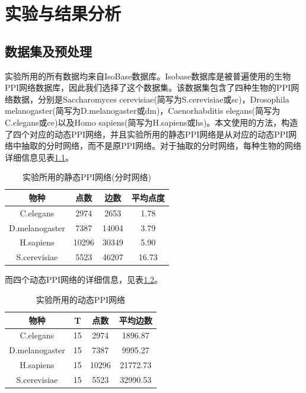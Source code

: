 \chapter{实验与结果分析}

\section{数据集及预处理}
实验所用的所有数据均来自IsoBase数据库\cite{park2011isobase}。Isobase数据库是被普遍使用的生物PPI网络数据库，因此我们选择了这个数据集。该数据集包含了四种生物的PPI网络数据，分别是Saccharomyces cerevisiae(简写为S.cerevisiae或sc)，Drosophila melanogaster(简写为D.melanogaster或dm)，Caenorhabditis elegans(简写为C.elegans或ce)以及Homo sapiens(简写为H.sapiens或hs)。本文使用\cite{zhang2016method}的方法，构造了四个对应的动态PPI网络，并且实验所用的静态PPI网络是从对应的动态PPI网络中抽取的分时网络，而不是原PPI网络。对于抽取的分时网络，每种生物的网络详细信息见表\ref{table:1.1}。

\begin{table}[htbp]
    \centering
    \caption{实验所用的静态PPI网络(分时网络)}
    \label{table:1.1}
    \begin{tabular}{cccc}
         \hline 物种&点数&边数&平均点度\\
         \hline C.elegans&2974&2653&1.78\\
         D.melanogaster&7387&14004&3.79\\
         H.sapiens&10296&30349&5.90\\
         S.cerevisiae&5523&46207&16.73\\
         \hline
    \end{tabular}
\end{table}

而四个动态PPI网络的详细信息，见表\ref{table:1.2}。

\begin{table}[htbp]
    \centering
    \caption{实验所用的动态PPI网络}
    \label{table:1.2}
    \begin{tabular}{cccc}
         \hline 物种&T&点数&平均边数\\
         \hline C.elegans&15&2974&1896.87\\
         D.melanogaster&15&7387&9995.27\\
         H.sapiens&15&10296&21772.73\\
         S.cerevisiae&15&5523&32990.53\\
         \hline
    \end{tabular}
\end{table}

